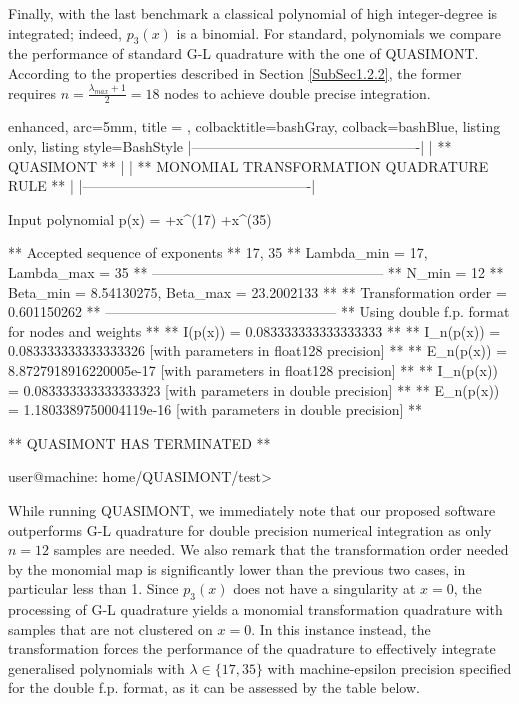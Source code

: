 \documentclass[a4paper, twosided]{book}
\begin{document}
\noindent
Finally, with the last benchmark a classical polynomial of high integer-degree is integrated; indeed, $p_3(x)$ is a binomial. For standard, polynomials we compare the performance of standard  G-L quadrature with the one of QUASIMONT. According to the properties described in Section \ref{SubSec1.2.2}, the former requires $n=\frac{\lambda_{max}+1}{2}=18$ nodes to achieve double precise integration.

\vspace{0.5cm}
\begin{tcblisting}{enhanced,
                   arc=5mm,
                   title = \color{black}{\large \ttfamily Building and executing the test driver: p\_3(x)},
                   colbacktitle=bashGray,
                   colback=bashBlue,
                   listing only,
                   listing style=BashStyle}           
    |-------------------------------------------------|
    |                 ** QUASIMONT **                 |
    |  ** MONOMIAL TRANSFORMATION QUADRATURE RULE **  |
    |-------------------------------------------------|
    
Input polynomial p(x) =  +x^(17)  +x^(35) 

 ** Accepted sequence of exponents ** 
    {17, 35}
 ** Lambda_min = 17, Lambda_max = 35 **
 --------------------------------------------------
 ** N_min = 12
 ** Beta_min = 8.54130275, Beta_max = 23.2002133 **
 ** Transformation order = 0.601150262 **
 --------------------------------------------------
 ** Using double f.p. format for nodes and weights **
 ** I(p(x))   = 0.083333333333333333 **
 ** I_n(p(x)) = 0.083333333333333326    [with parameters in float128 precision] **
 ** E_n(p(x)) = 8.8727918916220005e-17  [with parameters in float128 precision] **
 ** I_n(p(x)) = 0.083333333333333323    [with parameters in double precision] **
 ** E_n(p(x)) = 1.1803389750004119e-16  [with parameters in double precision] **

 ** QUASIMONT HAS TERMINATED **

user@machine: home/QUASIMONT/test>
\end{tcblisting}
\vspace{0.5cm}

\noindent
While running QUASIMONT, we immediately note that our proposed software outperforms G-L quadrature for double precision numerical integration as only $n=12$ samples are needed. We also remark  that the transformation order needed by the monomial map is significantly lower than the previous two cases, in particular less than 1. Since $p_3(x)$ does not have a singularity at $x=0$, the processing of G-L quadrature yields a monomial transformation quadrature with samples that are not clustered on $x=0$. In this instance instead, the transformation forces the performance of the quadrature to effectively integrate generalised polynomials with $\lambda\in\{17,35\}$ with machine-epsilon precision specified for the double f.p. format, as it can be assessed by the table below.
\end{document}
